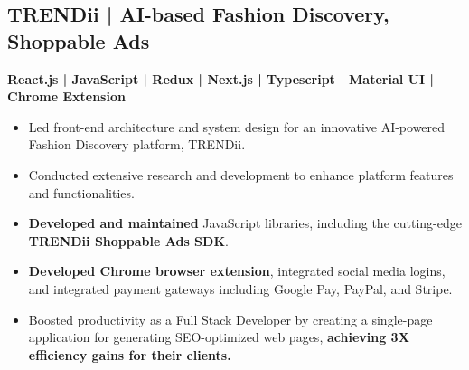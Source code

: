 \documentclass[letterpaper]{deedy-resume} %
\begin{document}
\begin{minipage}[t]{0.66\textwidth}

\subsection{TRENDii\href{https://www.trendii.com/}{\texorpdfstring{\faExternalLink}{}} | AI-based Fashion Discovery, Shoppable Ads}


\textbf{React.js | JavaScript | Redux | Next.js | Typescript | Material UI | Chrome Extension} \\
\vspace{-\topsep}
\begin{itemize}
    \setlength\itemsep{-0.5em} %
    \item Led front-end architecture and system design for an innovative AI-powered Fashion Discovery platform, TRENDii.
    \item Conducted extensive research and development to enhance platform features and functionalities.
    \item \textbf{Developed and maintained} JavaScript libraries, including the cutting-edge \textbf{TRENDii Shoppable Ads SDK}.
    \item \textbf{Developed Chrome browser extension}, integrated social media logins, and integrated payment gateways including Google Pay, PayPal, and Stripe.
    \item Boosted productivity as a Full Stack Developer by creating a single-page application for generating SEO-optimized web pages, \textbf{achieving 3X efficiency gains for their clients.}
\end{itemize}

\sectionspace %





\end{minipage} %


\newpage %
\end{document}
